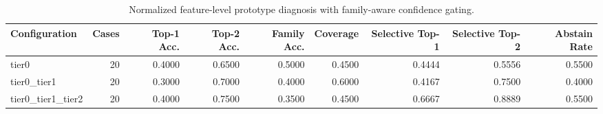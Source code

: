 \begin{table}[t]
\centering
\caption{Normalized feature-level prototype diagnosis with family-aware confidence gating.}
\label{tab:dice_stressor_hierarchical_diagnosis}
\footnotesize
\begin{tabular}{lrrrrrrrr}
\toprule
Configuration & Cases & Top-1 Acc. & Top-2 Acc. & Family Acc. & Coverage & Selective Top-1 & Selective Top-2 & Abstain Rate \\
\midrule
tier0 & 20 & 0.4000 & 0.6500 & 0.5000 & 0.4500 & 0.4444 & 0.5556 & 0.5500 \\
tier0_tier1 & 20 & 0.3000 & 0.7000 & 0.4000 & 0.6000 & 0.4167 & 0.7500 & 0.4000 \\
tier0_tier1_tier2 & 20 & 0.4000 & 0.7500 & 0.3500 & 0.4500 & 0.6667 & 0.8889 & 0.5500 \\
\bottomrule
\end{tabular}

\end{table}
